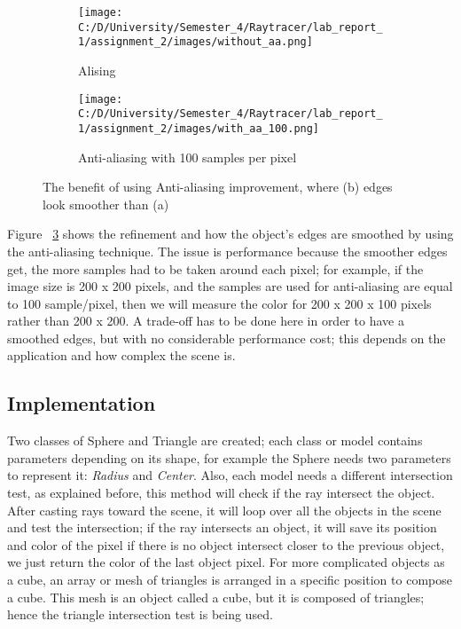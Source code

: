 \documentclass{article}
\begin{document}
	\begin{figure}[ht]
		\begin{center}
			\begin{subfigure}{.3\textwidth}
				\centering
				\texttt{[image: C:/D/University/Semester\_4/Raytracer/lab\_report\_1/assignment\_2/images/without\_aa.png]}  
				\caption{Alising}
				\label{fig:sub-first}
			\end{subfigure}
			\begin{subfigure}{.3\textwidth}
				\centering
				\texttt{[image: C:/D/University/Semester\_4/Raytracer/lab\_report\_1/assignment\_2/images/with\_aa\_100.png]}  
				\caption{Anti-aliasing with 100 samples per pixel}
				\label{fig:sub-second}
			\end{subfigure}
			
			\caption{The benefit of using Anti-aliasing improvement, where (b) edges look smoother than (a)}
			\label{fig:4}
		\end{center}
	\end{figure}
	
	
	Figure ~\ref{fig:4} shows the refinement and how the object's edges are smoothed by using the anti-aliasing technique. The issue is performance because the smoother edges get, the more samples had to be taken around each pixel; for example, if the image size is 200 x 200 pixels, and the samples are used for anti-aliasing are equal to 100 sample/pixel, then we will measure the color for 200 x 200 x 100 pixels rather than 200 x 200. 
	A trade-off has to be done here in order to have a smoothed edges, but with no considerable performance cost; this depends on the application and how complex the scene is. 
	
	
	\subsection{Implementation}
	Two classes of Sphere and Triangle are created; each class or model contains parameters depending on its shape, for example the Sphere needs two parameters to represent it: \textit{Radius} and \textit{Center}. Also, each model needs a different intersection test, as explained before, this method will check if the ray intersect the object. 
	After casting rays toward the scene, it will loop over all the objects in the scene and test the intersection; if the ray intersects an object, it will save its position and color of the pixel if there is no object intersect closer to the previous object, we just return the color of the last object pixel. 
	For more complicated objects as a cube, an array or mesh of triangles is arranged in a specific position to compose a cube. This mesh is an object called a cube, but it is composed of triangles; hence the triangle intersection test is being used.
	
\end{document}
